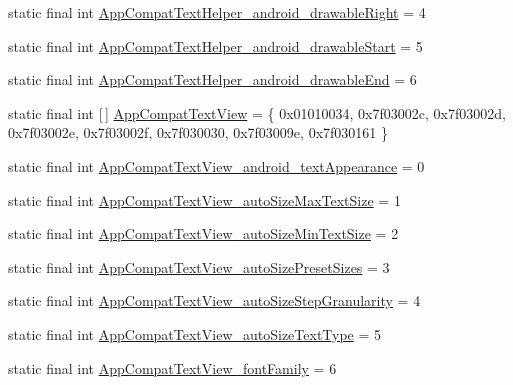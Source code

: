 \begin{DoxyCompactItemize}
static final int \mbox{\hyperlink{classandroid_1_1support_1_1design_1_1R_1_1styleable_a40dc16e17c8a3cdee08c9ef5170fec23}{App\+Compat\+Text\+Helper\+\_\+android\+\_\+drawable\+Right}} = 4
\item 
static final int \mbox{\hyperlink{classandroid_1_1support_1_1design_1_1R_1_1styleable_a58f154421ba8b61d7cc28a7f4387e2de}{App\+Compat\+Text\+Helper\+\_\+android\+\_\+drawable\+Start}} = 5
\item 
static final int \mbox{\hyperlink{classandroid_1_1support_1_1design_1_1R_1_1styleable_afd1efc9eb3776bd11b7615bbec9961b6}{App\+Compat\+Text\+Helper\+\_\+android\+\_\+drawable\+End}} = 6
\item 
static final int \mbox{[}$\,$\mbox{]} \mbox{\hyperlink{classandroid_1_1support_1_1design_1_1R_1_1styleable_a4f8449fe92fa53cd1fd4547247fe52b6}{App\+Compat\+Text\+View}} = \{ 0x01010034, 0x7f03002c, 0x7f03002d, 0x7f03002e, 0x7f03002f, 0x7f030030, 0x7f03009e, 0x7f030161 \}
\item 
static final int \mbox{\hyperlink{classandroid_1_1support_1_1design_1_1R_1_1styleable_a209c032caa80f4c43d72cadddbe05ec2}{App\+Compat\+Text\+View\+\_\+android\+\_\+text\+Appearance}} = 0
\item 
static final int \mbox{\hyperlink{classandroid_1_1support_1_1design_1_1R_1_1styleable_a53ae6fee67748ea9696e40327152e5a1}{App\+Compat\+Text\+View\+\_\+auto\+Size\+Max\+Text\+Size}} = 1
\item 
static final int \mbox{\hyperlink{classandroid_1_1support_1_1design_1_1R_1_1styleable_a89f29ea374b0c74e130833c33e7713d8}{App\+Compat\+Text\+View\+\_\+auto\+Size\+Min\+Text\+Size}} = 2
\item 
static final int \mbox{\hyperlink{classandroid_1_1support_1_1design_1_1R_1_1styleable_abf22bc31dc9b4273a1bebcad1658f3b6}{App\+Compat\+Text\+View\+\_\+auto\+Size\+Preset\+Sizes}} = 3
\item 
static final int \mbox{\hyperlink{classandroid_1_1support_1_1design_1_1R_1_1styleable_ac102a860e6dd2e6d051bf54c08c86f1d}{App\+Compat\+Text\+View\+\_\+auto\+Size\+Step\+Granularity}} = 4
\item 
static final int \mbox{\hyperlink{classandroid_1_1support_1_1design_1_1R_1_1styleable_a8ff9113264a34d65ef2323bb7549c510}{App\+Compat\+Text\+View\+\_\+auto\+Size\+Text\+Type}} = 5
\item 
static final int \mbox{\hyperlink{classandroid_1_1support_1_1design_1_1R_1_1styleable_a365ca916405d107594c65faf23d7c4f1}{App\+Compat\+Text\+View\+\_\+font\+Family}} = 6
\item 

\end{DoxyCompactItemize}
